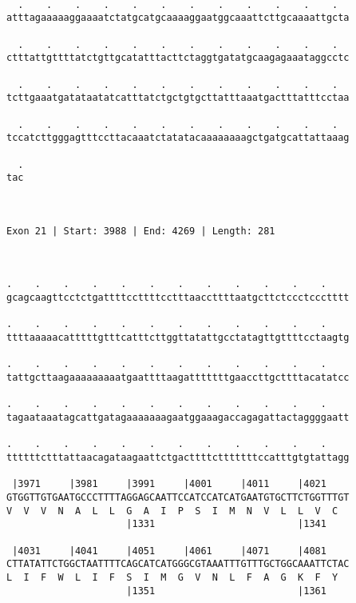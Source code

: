 \documentclass{article}
\begin{document}
\begin{Verbatim}
  
  .    .    .    .    .    .    .    .    .    .    .    .  
atttagaaaaaggaaaatctatgcatgcaaaaggaatggcaaattcttgcaaaattgcta
                                                            
  .    .    .    .    .    .    .    .    .    .    .    .  
ctttattgttttatctgttgcatatttacttctaggtgatatgcaagagaaataggcctc
                                                            
  .    .    .    .    .    .    .    .    .    .    .    .  
tcttgaaatgatataatatcatttatctgctgtgcttatttaaatgactttatttcctaa
                                                            
  .    .    .    .    .    .    .    .    .    .    .    .  
tccatcttgggagtttccttacaaatctatatacaaaaaaaagctgatgcattattaaag
                                                            
  .
tac
   
   
 
Exon 21 | Start: 3988 | End: 4269 | Length: 281



.    .    .    .    .    .    .    .    .    .    .    .    
gcagcaagttcctctgattttccttttcctttaaccttttaatgcttctccctccctttt
                                                            
.    .    .    .    .    .    .    .    .    .    .    .    
ttttaaaaacatttttgtttcatttcttggttatattgcctatagttgttttcctaagtg
                                                            
.    .    .    .    .    .    .    .    .    .    .    .    
tattgcttaagaaaaaaaaatgaattttaagatttttttgaaccttgcttttacatatcc
                                                            
.    .    .    .    .    .    .    .    .    .    .    .    
tagaataaatagcattgatagaaaaaaagaatggaaagaccagagattactaggggaatt
                                                            
.    .    .    .    .    .    .    .    .    .    .    .    
ttttttctttattaacagataagaattctgacttttctttttttccatttgtgtattagg
                                                            
 |3971     |3981     |3991     |4001     |4011     |4021    
GTGGTTGTGAATGCCCTTTTAGGAGCAATTCCATCCATCATGAATGTGCTTCTGGTTTGT
V  V  V  N  A  L  L  G  A  I  P  S  I  M  N  V  L  L  V  C  
                     |1331                         |1341    
  
 |4031     |4041     |4051     |4061     |4071     |4081    
CTTATATTCTGGCTAATTTTCAGCATCATGGGCGTAAATTTGTTTGCTGGCAAATTCTAC
L  I  F  W  L  I  F  S  I  M  G  V  N  L  F  A  G  K  F  Y  
                     |1351                         |1361    
  

\end{Verbatim}
\end{document}
